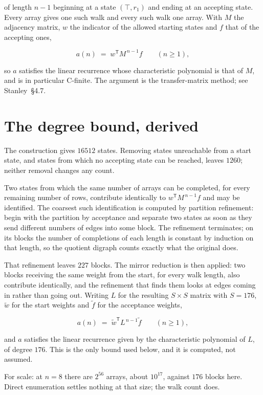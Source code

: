 \documentclass[11pt]{article}
\theoremstyle{definition}
\begin{document}
of length $n-1$ beginning at a state $(\top,r_1)$ and ending at an accepting state. Every array gives one such walk and every such walk one array. With $M$ the adjacency matrix, $w$ the indicator of the allowed starting states and $f$ that of the accepting ones,

\[a(n) \;=\; w^{\mathsf T} M^{\,n-1} f \qquad (n \ge 1),\]

so $a$ satisfies the linear recurrence whose characteristic polynomial is that of $M$, and is in particular C-finite. The argument is the transfer-matrix method; see Stanley~\S4.7.

\section{The degree bound, derived}

The construction gives $16512$ states. Removing states unreachable from a start state, and states from which no accepting state can be reached, leaves $1260$; neither removal changes any count.

Two states from which the same number of arrays can be completed, for every remaining number of rows, contribute identically to $w^{\mathsf T}M^{\,n-1}f$ and may be identified. The coarsest such identification is computed by partition refinement: begin with the partition by acceptance and separate two states as soon as they send different numbers of edges into some block. The refinement terminates; on its blocks the number of completions of each length is constant by induction on that length, so the quotient digraph counts exactly what the original does.

That refinement leaves $227$ blocks. The mirror reduction is then applied: two blocks receiving the same weight from the start, for every walk length, also contribute identically, and the refinement that finds them looks at edges coming in rather than going out. Writing $L$ for the resulting $S \times S$ matrix with $S = 176$, $\tilde w$ for the start weights and $\tilde f$ for the acceptance weights,

\[a(n) \;=\; \tilde w^{\mathsf T} L^{\,n-1} \tilde f \qquad (n \ge 1),\]

and $a$ satisfies the linear recurrence given by the characteristic polynomial of $L$, of degree $176$. This is the only bound used below, and it is computed, not assumed.

For scale: at $n = 8$ there are $2^{56}$ arrays, about $10^{17}$, against $176$ blocks here. Direct enumeration settles nothing at that size; the walk count does.
\end{document}
